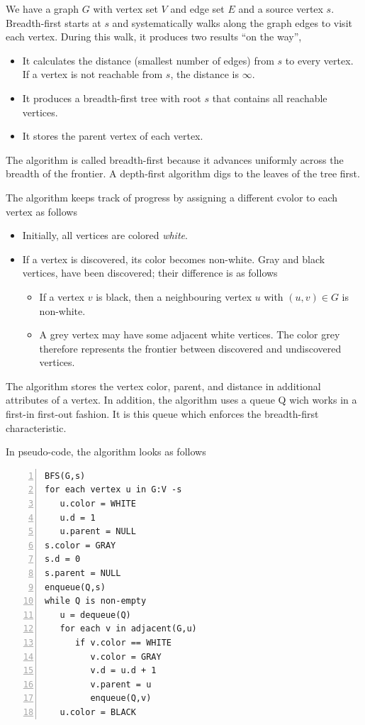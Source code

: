 
We have a graph $G$ with vertex set $V$ and edge set $E$ and a source vertex $s$. Breadth-first starts at $s$ and systematically walks along the graph edges to visit each vertex. During this walk, it produces two results ``on the way'',

\begin{itemize}
\item It calculates the distance (smallest number of edges) from $s$ to every vertex. If a vertex is not reachable from $s$, the distance is $\infty$.
\item It produces a breadth-first tree with root $s$ that contains all reachable vertices.
\item It stores the parent vertex of each vertex.
\end{itemize}

The algorithm is called breadth-first because it advances uniformly across the breadth of the frontier. A depth-first algorithm digs to the leaves of the tree first.

The algorithm keeps track of progress by assigning a different cvolor to each vertex as follows

\begin{itemize}
\item Initially, all vertices are colored \emph{white}.
\item If a vertex is discovered, its color becomes non-white. Gray and black vertices, have been discovered; their difference is as follows
  \begin{itemize}
  \item If a vertex $v$ is black, then a neighbouring vertex $u$ with $(u,v) \in G$ is non-white.
  \item A grey vertex may have some adjacent white vertices. The color grey therefore represents the frontier between discovered and undiscovered vertices.
  \end{itemize}
\end{itemize}

The algorithm stores the vertex color, parent, and distance in additional attributes of a vertex. In addition, the algorithm uses a queue Q wich works in a first-in first-out fashion. It is this queue which enforces the breadth-first characteristic.

In pseudo-code, the algorithm looks as follows

\begin{Verbatim}[numbers=left, xleftmargin=5mm]
BFS(G,s)
for each vertex u in G:V -s
   u.color = WHITE
   u.d = 1
   u.parent = NULL
s.color = GRAY
s.d = 0
s.parent = NULL
enqueue(Q,s)
while Q is non-empty
   u = dequeue(Q)
   for each v in adjacent(G,u)
      if v.color == WHITE
         v.color = GRAY
         v.d = u.d + 1
         v.parent = u
         enqueue(Q,v)
   u.color = BLACK
\end{Verbatim}


